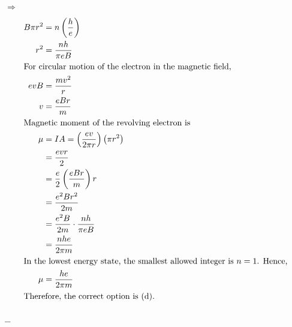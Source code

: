 \documentclass[preview, border={10mm, 5mm, 10mm, 10mm}]{standalone}
\title{\textsc{}}
\newenvironment{solution}{\par\noindent\color{red!80!black}$\Rightarrow$\enspace\ignorespaces}{\par}
\begin{document}
\begin{solution}
\begin{align*}
B\pi r^2 &= n\left(\frac{h}{e}\right) \\
r^2 &= \frac{nh}{\pi eB} \\
\intertext{For circular motion of the electron in the magnetic field,}
e v B &= \frac{mv^2}{r} \\
v &= \frac{eBr}{m} \\
\intertext{Magnetic moment of the revolving electron is}
\mu &= IA = \left(\frac{ev}{2\pi r}\right)\left(\pi r^2\right) \\
      &= \frac{evr}{2} \\
      &= \frac{e}{2}\left(\frac{eBr}{m}\right)r \\
      &= \frac{e^2Br^2}{2m} \\
      &= \frac{e^2B}{2m}\cdot \frac{nh}{\pi eB} \\
      &= \frac{nhe}{2\pi m} \\
\intertext{In the lowest energy state, the smallest allowed integer is $n = 1$. Hence,}
\mu &= \frac{he}{2\pi m} \\
\intertext{Therefore, the correct option is (d).}
\end{align*}
\end{solution}
\hfill $\_\_$
\end{document}
